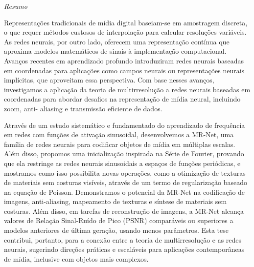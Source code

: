 
\thispagestyle{empty}
\null\vfil
\begin{center}
{\huge{\textit{Resumo}} \par}
\bigskip
\medskip
\bigskip
\end{center}

Representações tradicionais de mídia digital baseiam-se em amostragem discreta, o que
requer métodos custosos de interpolação para calcular resoluções variáveis. As redes neurais,
por outro lado, oferecem uma representação contínua que aproxima modelos matemáticos de
sinais à implementação computacional. Avanços recentes em aprendizado profundo
introduziram redes neurais baseadas em coordenadas para aplicações como campos neurais
ou representações neurais implícitas, que aproveitam essa perspectiva. Com base nesses
avanços, investigamos a aplicação da teoria de multirresolução a redes neurais baseadas em
coordenadas para abordar desafios na representação de mídia neural, incluindo zoom, anti-
aliasing e transmissão eficiente de dados.

Através de um estudo sistemático e fundamentado do aprendizado de frequência em redes
com funções de ativação sinusoidal, desenvolvemos a MR-Net, uma família de redes neurais
para codificar objetos de mídia em múltiplas escalas. Além disso, propomos uma inicialização
inspirada na Série de Fourier, provando que ela restringe as redes neurais sinusoidais a
espaços de funções periódicas, e mostramos como isso possibilita novas operações, como a
otimização de texturas de materiais sem costuras visíveis, através de um termo de
regularização baseado na equação de Poisson. Demonstramos o potencial da MR-Net na
codificação de imagens, anti-aliasing, mapeamento de texturas e síntese de materiais sem
costuras. Além disso, em tarefas de reconstrução de imagens, a MR-Net alcança valores de
Relação Sinal-Ruído de Pico (PSNR) comparáveis ou superiores a modelos anteriores de
última geração, usando menos parâmetros. Esta tese contribui, portanto, para a conexão entre
a teoria de multirresolução e as redes neurais, sugerindo direções práticas e escaláveis para
aplicações contemporâneas de mídia, inclusive com objetos mais complexos.